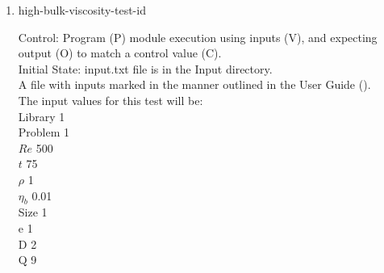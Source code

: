 \documentclass[12pt, titlepage]{article}
\newcommand{\famname}{Lattice Boltzmann Solver}
\newcounter{testcounter} %
\begin{document}
\begin{enumerate}
Output: Vorticity vector values printed to the screen.  \\

Test Case Derivation: This case is a comparison with the pseudo-oracle
pyLBM. The C values of this test for pyLBM can be found in the file
id9output.txt located in the OracleOutput folder. The output values of {\famname} will be compared to the pseudo-oracle output values.\\
This test covers the low bound for bulk viscosity.\\
		
How test will be performed: 

\begin{enumerate}
\item The Von Karman Vortex Street module shall be modified by the author to
  print the vorticity vector as output.
\item Outside of the system, the input parameter values will be written to a text file titled input.txt, as outlined in Section \ref{ext4-inputs} of the User Guide.
\item The file will be placed into the Input directory, under the home directory of the project.
\item {\famname} shall be run.
\item Upon completion of the module, the output values of the vorticity vector
  will be compared to the vorticity vector values from pyLBM - comparison will
  be done per cell. Comparisons can be done manually using Excel, or through a
  script, using the equation for relative error found in Section \ref{eqerror}.
\end{enumerate}

\item{high-bulk-viscosity-test-id\thetestcounter \\}

Control: Program (P) module execution using inputs (V), and expecting output (O) to match a control value (C).\\
					
Initial State: input.txt file is in the Input directory.\\
					
A file with inputs marked in the manner outlined in the User
Guide (\citet{LBM_UserGuide_PM}).\\The input values for this test will be:\\
  Library 1\\
Problem 1\\
$Re$ 500\\
$t$ 75\\
$\rho$ 1\\
$\eta_b$ 0.01\\
Size 1\\
$\mathrm{e}$ 1\\
$\mathrm{D}$ 2\\
$\mathrm{Q}$ 9\\


\end{enumerate}
\end{document}

